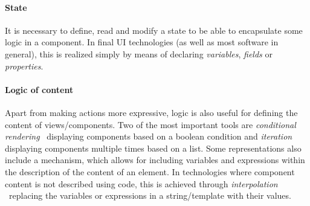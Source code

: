 \paragraph{State}
It is necessary to define, read and modify a state to be able to encapsulate some logic in a component.
In final UI technologies (as well as most software in general), this is realized simply by means of declaring \emph{variables}, \emph{fields} or \emph{properties}.

%

\paragraph{Logic of content}
Apart from making actions more expressive, logic is also useful for defining the content of views/components.
Two of the most important tools are \emph{conditional rendering} \textendash\ displaying components based on a boolean condition and \emph{iteration} displaying components multiple times based on a list.
Some representations also include a mechanism, which allows for including variables and expressions within the description of the content of an element.
In technologies where component content is not described using code, this is achieved through \emph{interpolation} \textendash\ replacing the variables or expressions in a string/template with their values.

